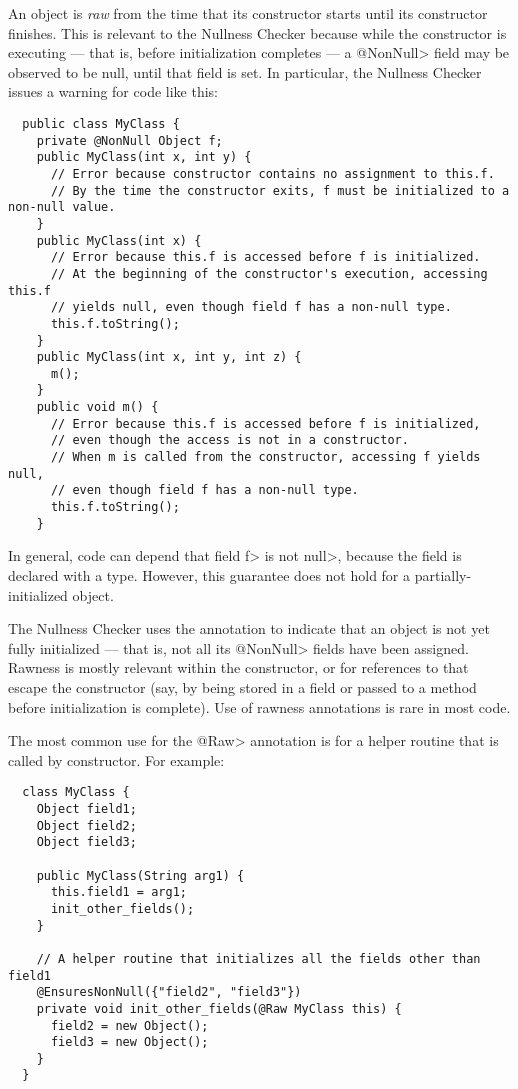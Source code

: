 


An object is
\emph{raw} from the time that its constructor starts until its constructor
finishes.  This is relevant to the Nullness Checker because while the
constructor is executing --- that is, before initialization completes ---
a \<@NonNull>
field may be observed to be null, until that field is set.  In
particular, the Nullness Checker issues a warning for code like this:

\begin{Verbatim}
  public class MyClass {
    private @NonNull Object f;
    public MyClass(int x, int y) {
      // Error because constructor contains no assignment to this.f.
      // By the time the constructor exits, f must be initialized to a non-null value.
    }
    public MyClass(int x) {
      // Error because this.f is accessed before f is initialized.
      // At the beginning of the constructor's execution, accessing this.f
      // yields null, even though field f has a non-null type.
      this.f.toString();
    }
    public MyClass(int x, int y, int z) {
      m();
    }
    public void m() {
      // Error because this.f is accessed before f is initialized,
      // even though the access is not in a constructor.
      // When m is called from the constructor, accessing f yields null,
      // even though field f has a non-null type.
      this.f.toString();
    }
\end{Verbatim}

\noindent
In general, code can depend that field \<f> is not \<null>, because the
field is declared with a  type.
However, this guarantee does not hold for a partially-initialized object.

The Nullness Checker uses the  annotation to indicate that an object
is not yet fully initialized --- that is, not all its \<@NonNull> fields have been
assigned.  Rawness is mostly relevant within the constructor, or for
references to  that escape the constructor (say, by being stored
in a field or passed to a method before initialization is complete).
Use of rawness annotations is rare in most code.

The most common use for the \<@Raw> annotation is for a helper routine that
is called by constructor.  For example:

\begin{Verbatim}
  class MyClass {
    Object field1;
    Object field2;
    Object field3;

    public MyClass(String arg1) {
      this.field1 = arg1;
      init_other_fields();
    }

    // A helper routine that initializes all the fields other than field1
    @EnsuresNonNull({"field2", "field3"})
    private void init_other_fields(@Raw MyClass this) {
      field2 = new Object();
      field3 = new Object();
    }
  }
\end{Verbatim}

